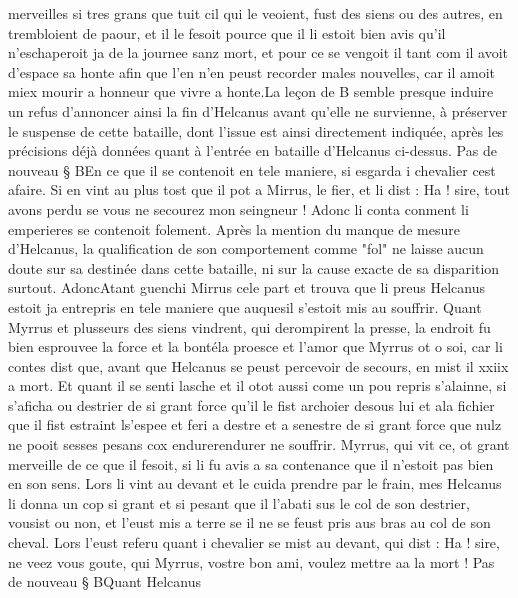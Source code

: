 \documentclass{article}
\begin{document}
\begin{pages}
   merveilles si tres grans que tuit cil qui le veoient, fust des siens ou des autres, en trembloient de paour, 
   et il le fesoit pource que il li estoit bien avis qu’il n’eschaperoit ja de la journee sanz mort, et pour ce 
      se vengoit il tant com 
   il avoit d’espace sa honte afin que l’en n’en peust recorder males 
      nouvelles, car il amoit miex mourir a honneur que vivre a honte.La leçon de B
      semble presque induire un refus d'annoncer ainsi la fin d'Helcanus avant qu'elle ne survienne, à préserver le suspense de cette bataille,
      dont l'issue est ainsi directement indiquée, après les précisions déjà données quant à l'entrée en bataille d'Helcanus ci-dessus. \pend
\pstart Pas de nouveau § BEn ce que il se contenoit en tele maniere, 
   si esgarda i chevalier cest afaire. Si en vint au plus tost que il 
   pot a Mirrus, le fier, et li dist :
   Ha ! sire, tout avons perdu se vous ne secourez mon seingneur !
   Adonc li conta conment li emperieres se contenoit folement.
   Après la mention du manque de mesure d'Helcanus, la qualification de son comportement comme "fol" ne laisse
   aucun doute sur sa destinée dans cette bataille, ni sur la cause exacte de sa disparition surtout.
   AdoncAtant guenchi Mirrus cele part 
   et trouva que li preus Helcanus estoit ja entrepris en tele maniere que 
   auquesil s’estoit 
   mis au souffrir. Quant 
   Myrrus et plusseurs des siens vindrent, qui derompirent la presse, la endroit fu bien esprouvee 
   la force et la bontéla proesce et l'amor que 
   Myrrus ot o soi, car li contes dist que, avant que 
   Helcanus se peust percevoir de secours, en mist il 
   xxiix a mort. Et quant il se senti lasche et il 
   otot aussi come un pou repris s’alainne, si s’aficha ou destrier de si 
   grant force qu’il le fist archoier desous lui et ala fichier que il fist estraint 
   ls’espee et feri a destre et a senestre de si grant force que nulz ne pooit 
   sesses pesans cox 
   endurerendurer ne souffrir. \pend
\pstart Myrrus, qui vit ce, ot grant merveille de ce que il fesoit, 
   si li fu avis a sa contenance que il n’estoit pas bien en son sens. Lors li vint au devant et le cuida 
   prendre par le frain, 
   mes Helcanus li donna un cop si grant et si pesant que il l’abati sus le col de son destrier, 
   vousist ou non, et l’eust mis a terre se il ne se feust pris aus bras au col de son cheval. 
   Lors l’eust referu quant i chevalier se mist au devant, qui dist :
   Ha ! sire, ne veez vous goute, qui Myrrus, vostre bon ami, 
      voulez mettre aa la mort ! \pend
\pstart Pas de nouveau § BQuant Helcanus 

\end{pages}
\end{document}
